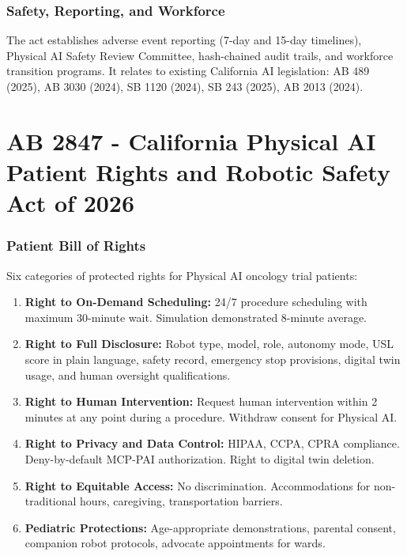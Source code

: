 \documentclass[11pt,letterpaper]{article}
\begin{document}
\section{Safety, Reporting, and Workforce}

The act establishes adverse event reporting (7-day and 15-day timelines),
Physical AI Safety Review Committee, hash-chained audit trails, and workforce
transition programs. It relates to existing California AI legislation: AB 489
(2025), AB 3030 (2024), SB 1120 (2024), SB 243 (2025), AB 2013 (2024).

\newpage


\part{AB 2847 - California Physical AI Patient Rights
and Robotic Safety Act of 2026}

\section{Patient Bill of Rights}

Six categories of protected rights for Physical AI oncology trial patients:

\begin{enumerate}[label=(\arabic*)]
\item \textbf{Right to On-Demand Scheduling:} 24/7 procedure scheduling with
  maximum 30-minute wait. Simulation demonstrated 8-minute average.
\item \textbf{Right to Full Disclosure:} Robot type, model, role, autonomy mode,
  USL score in plain language, safety record, emergency stop provisions,
  digital twin usage, and human oversight qualifications.
\item \textbf{Right to Human Intervention:} Request human intervention within 2
  minutes at any point during a procedure. Withdraw consent for Physical AI.
\item \textbf{Right to Privacy and Data Control:} HIPAA, CCPA, CPRA compliance.
  Deny-by-default MCP-PAI authorization. Right to digital twin deletion.
\item \textbf{Right to Equitable Access:} No discrimination. Accommodations for
  non-traditional hours, caregiving, transportation barriers.
\item \textbf{Pediatric Protections:} Age-appropriate demonstrations, parental
  consent, companion robot protocols, advocate appointments for wards.
\end{enumerate}
\end{document}
